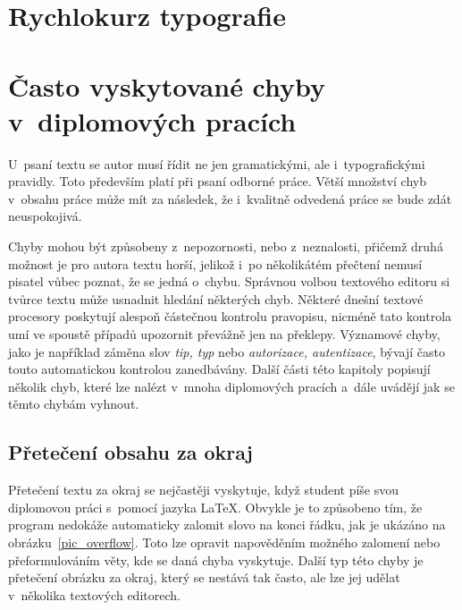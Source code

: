 \chapter{Rychlokurz typografie}






\chapter{Často vyskytované chyby v~diplomových pracích}
U~psaní textu se autor musí řídit ne jen gramatickými, ale i~typografickými
pravidly. Toto především platí při psaní odborné práce. Větší množství chyb
v~obsahu práce může mít za následek, že i~kvalitně odvedená práce se bude zdát
neuspokojivá.

Chyby mohou být způsobeny z~nepozornosti, nebo z~neznalosti, přičemž druhá možnost
je pro autora textu horší, jelikož i~po několikátém přečtení nemusí pisatel vůbec
poznat, že se jedná o~chybu. Správnou volbou textového editoru si tvůrce textu
může usnadnit hledání některých chyb. Některé dnešní textové procesory poskytují
alespoň částečnou kontrolu pravopisu, nicméně tato kontrola umí ve spoustě případů
upozornit převážně jen na překlepy. Významové chyby, jako je například záměna slov
\emph{tip, typ} nebo \emph{autorizace, autentizace}, bývají často touto
automatickou kontrolou zanedbávány. Další části této kapitoly popisují několik
chyb, které lze nalézt v~mnoha diplomových pracích a~dále uvádějí jak se těmto
chybám vyhnout.


\section{Přetečení obsahu za okraj}
Přetečení textu za okraj se nejčastěji vyskytuje, když student píše svou diplomovou
práci s~pomocí jazyka {\LaTeX}. Obvykle je to způsobeno tím, že program nedokáže
automaticky zalomit slovo na konci řádku, jak je ukázáno na
obrázku~\ref{pic_overflow}. Toto lze opravit napověděním možného
zalomení nebo přeformulováním věty, kde se daná chyba vyskytuje.
Další typ této chyby je přetečení obrázku za okraj,
který se nestává tak často, ale lze jej udělat v~několika textových editorech.

